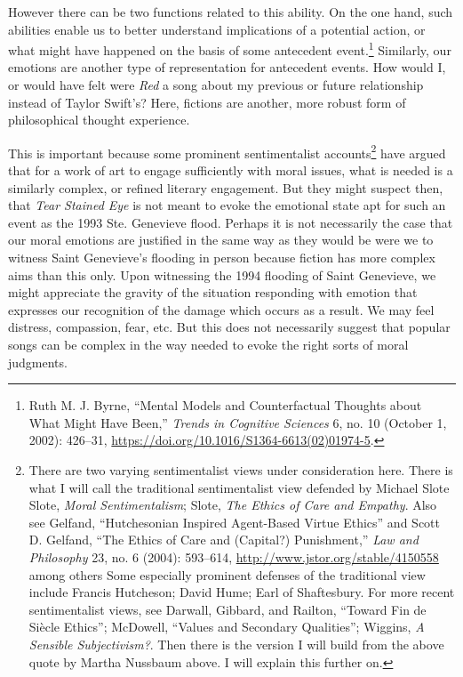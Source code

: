 \documentclass[phdthesis,12pt,final]{wuthesis}
\theoremstyle{definition}
\theoremstyle{definition}
\theoremstyle{definition}
\theoremstyle{definition}
\theoremstyle{remark}
\begin{document}
However there can be two functions related to this ability. On the one hand, such abilities enable us to better understand implications of a potential action, or what might have happened on the basis of some antecedent event.\footnote{Ruth M. J. Byrne, {``Mental Models and Counterfactual Thoughts about What Might Have Been,''} \emph{Trends in Cognitive Sciences} 6, no. 10 (October 1, 2002): 426--31, \url{https://doi.org/10.1016/S1364-6613(02)01974-5}.} Similarly, our emotions are another type of representation for antecedent events. How would I, or would have felt were \emph{Red} a song about my previous or future relationship instead of Taylor Swift's? Here, fictions are another, more robust form of philosophical thought experience.

This is important because some prominent sentimentalist accounts\footnote{There are two varying sentimentalist views under consideration here. There is what I will call the traditional sentimentalist view defended by Michael Slote Slote, \emph{Moral {Sentimentalism}}; Slote, \emph{The {Ethics} of {Care} and {Empathy}}. Also see Gelfand, {``Hutchesonian Inspired Agent-Based Virtue Ethics''} and Scott D. Gelfand, {``The {Ethics} of {Care} and ({Capital}?) {Punishment},''} \emph{Law and Philosophy} 23, no. 6 (2004): 593--614, \url{http://www.jstor.org/stable/4150558} among others Some especially prominent defenses of the traditional view include Francis Hutcheson; David Hume; Earl of Shaftesbury. For more recent sentimentalist views, see Darwall, Gibbard, and Railton, {``Toward Fin de Siècle Ethics''}; McDowell, {``Values and {Secondary Qualities}''}; Wiggins, \emph{A {Sensible Subjectivism}?}. Then there is the version I will build from the above quote by Martha Nussbaum above. I will explain this further on.} have argued that for a work of art to engage sufficiently with moral issues, what is needed is a similarly complex, or refined literary engagement. But they might suspect then, that \emph{Tear Stained Eye} is not meant to evoke the emotional state apt for such an event as the 1993 Ste. Genevieve flood. Perhaps it is not necessarily the case that our moral emotions are justified in the same way as they would be were we to witness Saint Genevieve's flooding in person because fiction has more complex aims than this only. Upon witnessing the 1994 flooding of Saint Genevieve, we might appreciate the gravity of the situation responding with emotion that expresses our recognition of the damage which occurs as a result. We may feel distress, compassion, fear, etc. But this does not necessarily suggest that popular songs can be complex in the way needed to evoke the right sorts of moral judgments.
\end{document}
